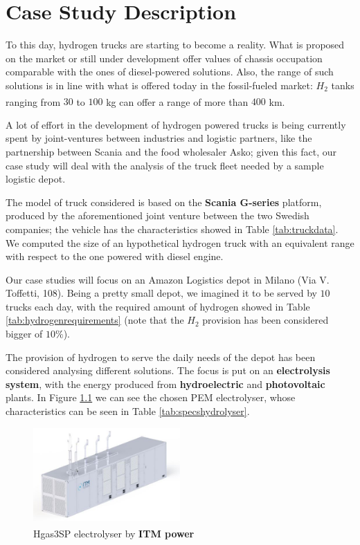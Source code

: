 \newpage
\chapter{Case Study Description}
To this day, hydrogen trucks are starting to become a reality. 
What is proposed on the market or still under development offer values of chassis occupation comparable with the ones of diesel-powered solutions.
Also, the range of such solutions is in line with what is offered today in the fossil-fueled market: $H_2$ tanks ranging from $30$ to $100$ kg can offer a range of more than $400$ km\textsuperscript{\cite{pianoidrogeno}}.

A lot of effort in the development of hydrogen powered trucks is being currently spent by joint-ventures between industries and logistic partners, like the partnership between Scania and the food wholesaler Asko; given this fact, our case study will deal with the analysis of the truck fleet needed by a sample logistic depot.

The model of truck considered is based on the\textbf{ Scania G-series} platform, produced by the aforementioned joint venture between the two Swedish companies; the vehicle has the characteristics showed in Table \ref{tab:truckdata}. We computed the size of an hypothetical hydrogen truck with an equivalent range with respect to the one powered with diesel engine.



Our case studies will focus on an Amazon Logistics depot in Milano (Via V. Toffetti, 108). Being a pretty small depot, we imagined it to be served by $10$ trucks each day, with the required amount of hydrogen showed in Table \ref{tab:hydrogenrequirements} (note that the $H_2$ provision has been considered bigger of $10\%$).



The provision of hydrogen to serve the daily needs of the depot has been considered analysing different solutions. The focus is put on an \textbf{electrolysis system}, with the energy produced from \textbf{hydroelectric} and \textbf{photovoltaic} plants. In Figure \ref{fig:electrolyser} we can see the chosen PEM electrolyser, whose characteristics can be seen in Table \ref{tab:specshydrolyser}.

\begin{figure}[H]
\centering
    \includegraphics[width=0.5\textwidth]{Chapters/Pictures/HGas 3SP.JPG}
    \caption{Hgas3SP electrolyser by \textbf{ITM power}\textsuperscript{\cite{HGas3SP}}}
    \label{fig:electrolyser}
\end{figure}

